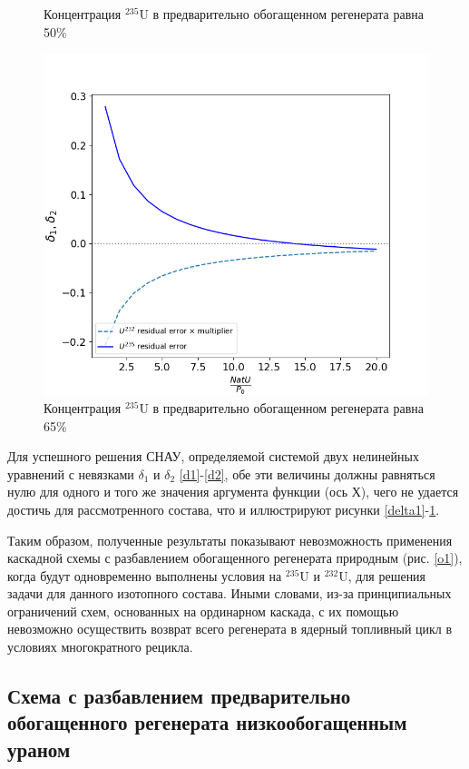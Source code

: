 \begin{figure}[ht]
\begin{minipage}{.5\textwidth}
    \caption{Концентрация $^{235}$U в предварительно обогащенном регенерата равна 50\%}
    \label{delta3}
  \end{minipage}
  \begin{minipage}{.5\textwidth}
    \centering
    \includegraphics[width=.8\linewidth]{images/plots/65}  
    \caption{Концентрация $^{235}$U в предварительно обогащенном регенерата равна 65\%}
    \label{delta4}
  \end{minipage}
 \end{figure}

Для успешного решения СНАУ, определяемой системой двух нелинейных уравнений с невязками $\delta_1$ и $\delta_2$ \ref{d1}-\ref{d2}, обе эти величины должны равняться нулю для одного и того же значения аргумента функции (ось  Х), чего не удается достичь для рассмотренного состава, что и иллюстрируют рисунки \ref{delta1}-\ref{delta4}.

Таким образом, полученные результаты показывают невозможность применения каскадной схемы с разбавлением обогащенного регенерата природным (рис. \ref{o1}), когда будут одновременно выполнены условия на $^{235}$U и $^{232}$U, для решения задачи для данного изотопного состава. Иными словами, из-за принципиальных ограничений схем, основанных на ординарном каскада, с их помощью невозможно осуществить возврат всего регенерата в ядерный топливный цикл в условиях многократного рецикла.

\subsection{Схема с разбавлением предварительно обогащенного регенерата низкообогащенным ураном}

